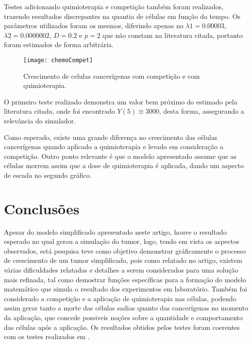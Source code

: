 \documentclass[12pt]{article}
\begin{document}
Testes adicionando quimioterapia e competição também foram realizados, trazendo resultados discrepantes na quantia de células em função do tempo. Os parâmetros utilizados foram os mesmos, diferindo apenas no $\lambda1 = 0.00003$, $\lambda2 = 0.0000002$, $D = 0.2$ e $p = 2$ que não constam na literatura citada, portanto foram estimados de forma arbitrária.

\begin{figure}[ht]
  \centering
  \texttt{[image: chemoCompet]}
  \caption{Crescimento de celulas cancerígenas com competição e com quimioterapia.}
\end{figure}

O primeiro teste realizado demonstra um valor bem próximo do estimado pela literatura citada, onde foi encontrado $Y(5) \cong 3000$, desta forma, assegurando a relevância do simulador.

Como esperado, existe uma grande diferença no crescimento das células cancerígenas quando aplicado a quimioterapia e levado em consideração a competição. Outro ponto relevante é que o modelo apresentado assume que as células morrem assim que a dose de quimioterapia é aplicada, dando um aspecto de escada no segundo gráfico.

\section{Conclusões} \label{sec:conclusions}

Apesar do modelo simplificado apresentado neste artigo, houve o resultado esperado no qual gerou a simulação do tumor, logo, tendo em vista os aspectos observados, está pesquisa teve como objetivo demonstrar gráficamente o processo de crescimento de um tumor simplificado, pois como relatado no artigo, existem várias dificuldades relatadas e detalhes a serem considerados para uma solução mais refinada, tal como demostrar funções específicas para a formação do modelo matemático que simula o resultado dos experimentos em laboratório. Também foi considerado a competição e a aplicação de quimioterapia nas células, podendo assim gerar tanto a morte das células sadias quanto das cancerígenas no momento da aplicação, que concede possiveis noções sobre a quantidade e comportamento das células após a aplicação. Os resultados obtidos pelos testes foram coerentes com os testes realizados em \cite{Cornil1991}.
\end{document}
